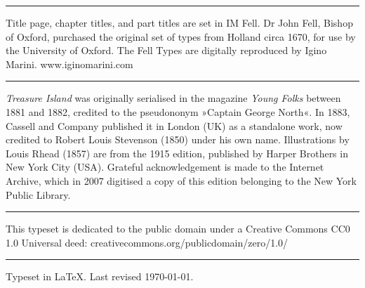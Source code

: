 \documentclass[
a5paper,
BCOR=7mm,
twoside,
DIV=calc,
11pt,
usegeometry,
chapterprefix,
headings=big]{scrbook} %
\begin{document}
\rule{0.5\textwidth}{.4pt}

Title page, chapter titles, and part titles are set in IM Fell. Dr John Fell, Bishop of Oxford, purchased the original set of types from Holland circa 1670, for use by the University of Oxford. The Fell Types are digitally reproduced by Igino Marini. www.iginomarini.com


\rule{0.5\textwidth}{.4pt}

\textit{Treasure Island} was originally serialised in the magazine \textit{Young Folks} between 1881 and 1882, credited to the pseudononym »Captain George North«. In 1883, Cassell and Company published it in London (UK) as a standalone work, now credited to Robert Louis Stevenson (1850) under his own name. Illustrations by Louis Rhead (1857) are from the 1915 edition, published by Harper Brothers in New York City (USA). Grateful acknowledgement is made to the Internet Archive, which in 2007 digitised a copy of this edition belonging to the New York Public Library.

\rule{0.5\textwidth}{.4pt}


This typeset is dedicated to the public domain under a Creative Commons CC0 1.0 Universal deed: creativecommons.org/publicdomain/zero/1.0/\\

\rule{0.5\textwidth}{.4pt}

Typeset in \LaTeX{}. Last revised \today.
\enlargethispage{2\baselineskip}
\thispagestyle{empty}
\end{document}
